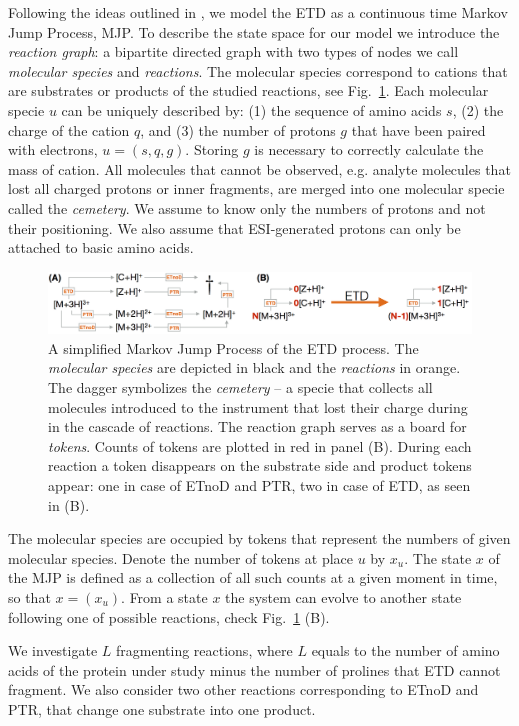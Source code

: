 \documentclass{llncs}
\begin{document}
Following the ideas outlined in \cite{Gambin2010}, we model the ETD as a continuous time Markov Jump Process, MJP. To describe the state space for our model we introduce the \textit{reaction graph}: a bipartite directed graph with two types of nodes we call \textit{molecular species} and \textit{reactions}. The molecular species correspond to cations that are substrates or products of the studied reactions, see Fig.~\ref{img::petrinet}. Each molecular specie $u$ can be uniquely described by: (1) the sequence of amino acids $s$, (2) the charge of the cation $q$, and (3) the number of protons $g$ that have been paired with electrons, $u = (s,q,g)$. Storing $g$ is necessary to correctly calculate the mass of cation. All molecules that cannot be observed, e.g. analyte molecules that lost all charged protons or inner fragments, are merged into one molecular specie called the \textit{cemetery}. We assume to know only the numbers of protons and not their positioning. We also assume that ESI-generated protons can only be attached to basic amino acids.
\begin{figure}[h]
        \center
        \includegraphics[width=\textwidth]{petrinet.png}
        \caption{A simplified Markov Jump Process of the ETD process. The \textit{molecular species} are depicted in black and the \textit{reactions} in orange. The dagger symbolizes the \textit{cemetery} -- a specie that collects all molecules introduced to the instrument that lost their charge during in the cascade of reactions. The reaction graph serves as a board for \textit{tokens}. Counts of tokens are plotted in red in panel (B). During each reaction a token disappears on the substrate side and product tokens appear: one in case of ETnoD and PTR, two in case of ETD, as seen in (B).}\label{img::petrinet}
\end{figure}

The molecular species are occupied by tokens that represent the numbers of given molecular species. Denote the number of tokens at place $u$ by $x_u$. The state $x$ of the MJP is defined as a collection of all such counts at a given moment in time, so that $x = (x_u)$.  From a state $x$ the system can evolve to another state following one of possible reactions, check Fig.~\ref{img::petrinet} (B).

We investigate $L$ fragmenting reactions, where $L$ equals to the number of amino acids of the protein under study minus the number of prolines that ETD cannot fragment. We also consider two other reactions corresponding to ETnoD and PTR, that change one substrate into one product.
\end{document}
